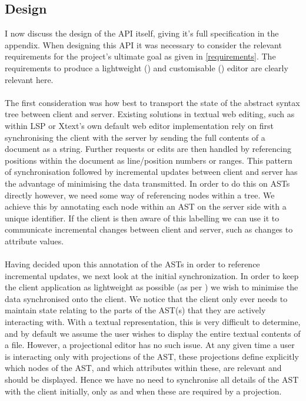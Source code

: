\documentclass{article}
\begin{document}
\subsection{Design}\label{apiDesign}
I now discuss the design of the API itself, giving it's full specification in the appendix. When designing this API it was necessary to consider the relevant requirements for the project's ultimate goal as given in \ref{requirements}. The requirements to produce a lightweight (\RLightweight) and customisable (\RCustom) editor are clearly relevant here.
\\
\\
The first consideration was how best to transport the state of the abstract syntax tree between client and server. Existing solutions in textual web editing, such as within LSP or Xtext's own default web editor implementation rely on first synchronising the client with the server by sending the full contents of a document as a string. Further requests or edits are then handled by referencing positions within the document as line/position numbers or ranges. This pattern of synchronisation followed by incremental updates between client and server has the advantage of minimising the data transmitted. In order to do this on ASTs directly however, we need some way of referencing nodes within a tree. We achieve this by annotating each node within an AST on the server side with a unique identifier. If the client is then aware of this labelling we can use it to communicate incremental changes between client and server, such as changes to attribute values.
\\
\\
Having decided upon this annotation of the ASTs in order to reference incremental updates, we next look at the initial synchronization. In order to keep the client application as lightweight as possible (as per \RLightweight) we wish to minimise the data synchronised onto the client. We notice that the client only ever needs to maintain state relating to the parts of the AST(s) that they are actively interacting with. With a textual representation, this is very difficult to determine, and by default we assume the user wishes to display the entire textual contents of a file. However, a projectional editor has no such issue. At any given time a user is interacting only with projections of the AST, these projections define explicitly which nodes of the AST, and which attributes within these, are relevant and should be displayed. Hence we have no need to synchronise all details of the AST with the client initially, only as and when these are required by a projection.
\end{document}
